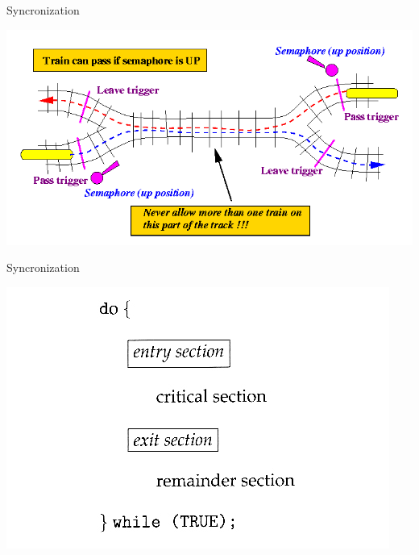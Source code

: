 \begin{frame}{Syncronization}
  \begin{center}
    \includegraphics[width=\textwidth,keepaspectratio]{sources/images/semaphore.png}
  \end{center}
\end{frame}

\begin{frame}{Syncronization}
  \begin{center}
    \includegraphics[width=\textwidth,keepaspectratio]{sources/images/5_01_CriticalSection.jpg}
  \end{center}
\end{frame}
